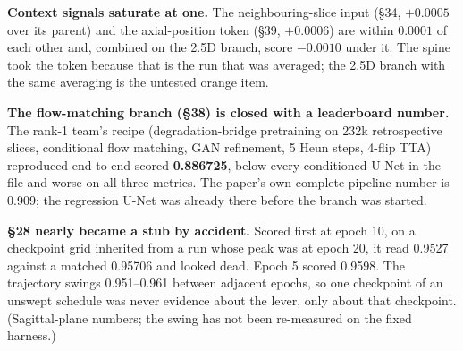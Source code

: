 \documentclass[10pt,a4paper]{article}
\begin{document}
{\textbf{Context signals saturate at one.} The neighbouring-slice input (\S34, $+0.0005$ over
its parent) and the axial-position token (\S39, $+0.0006$) are within $0.0001$ of each other
and, combined on the 2.5D branch, score $-0.0010$ under it. The spine took the token because
that is the run that was averaged; the 2.5D branch with the same averaging is the untested
orange item.

\textbf{The flow-matching branch (\S38) is closed with a leaderboard number.} The rank-1
team's recipe (degradation-bridge pretraining on 232k retrospective slices, conditional
flow matching, GAN refinement, 5 Heun steps, 4-flip TTA) reproduced end to end scored
\textbf{0.886725}, below every conditioned U-Net in the file and worse on all three metrics.
The paper's own complete-pipeline number is 0.909; the regression U-Net was already there
before the branch was started.

\smallskip
\textbf{\S28 nearly became a stub by accident.} Scored first at epoch 10, on a checkpoint grid
inherited from a run whose peak was at epoch 20, it read 0.9527 against a matched 0.95706 and
looked dead. Epoch 5 scored 0.9598. The trajectory swings 0.951--0.961 between adjacent epochs,
so one checkpoint of an unswept schedule was never evidence about the lever, only about that
checkpoint. (Sagittal-plane numbers; the swing has not been re-measured on the fixed harness.)}
\end{document}
